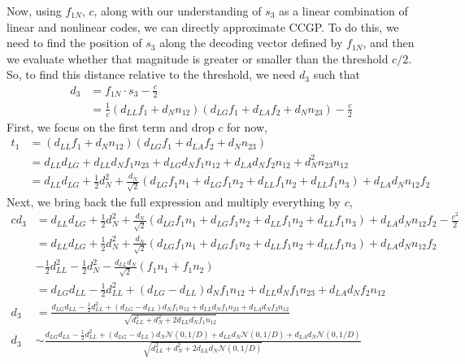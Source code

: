 \documentclass[letter,12pt]{article}
\newcommand{\dll}{d_{LL}}
\newcommand{\dlg}{d_{LG}}
\newcommand{\dla}{d_{LA}}
\newcommand{\dn}{d_{N}}
\newcommand{\dis}{\mathcal{N}(0, 1/D)}
\begin{document}
Now, using $f_{1N}$, $c$, along with our understanding of $s_{3}$
as a linear combination of linear and nonlinear codes, we can directly
approximate CCGP. To do this, we need to find the position
of $s_{3}$ along the decoding vector defined by $f_{1N}$, and then
we evaluate whether that magnitude is greater or smaller than the threshold
$c/2$. So, to find this distance relative to the threshold, we need $d_{3}$ such
that
\begin{align}
  d_{3} &= f_{1N} \cdot s_{3} - \frac{c}{2} \\
  &= \frac{1}{c}\left(\dll f_{1} + \dn n_{12}\right)
  \left(\dlg f_{1} + \dla f_{2} + \dn n_{23}\right) - \frac{c}{2} 
\end{align}
First, we focus on the first term and drop $c$ for now,
\begin{align}
  t_{1} &= \left(\dll f_{1} + \dn n_{12}\right)
  \left(\dlg f_{1} + \dla f_{2} + \dn n_{23}\right) \\
  &= \dll\dlg + \dll \dn f_{1} n_{23} + \dlg \dn f_{1} n_{12}
  + \dla \dn f_{2} n_{12} + \dn^{2} n_{23} n_{12} \\
  &= \dll\dlg + \frac{1}{2}\dn^{2}
  + \frac{\dn}{\sqrt{2}}\left(\dlg f_{1}n_{1} + \dlg f_{1}n_{2}
  + \dll f_{1}n_{2} + \dll f_{1}n_{3}\right) + \dla \dn n_{12}f_{2} 
\end{align}
Next, we bring back the full expression and multiply everything by $c$,
\begin{align}
  c d_{3} &= \dll\dlg + \frac{1}{2}\dn^{2}
  + \frac{\dn}{\sqrt{2}}\left(\dlg f_{1}n_{1} + \dlg f_{1}n_{2}
  + \dll f_{1}n_{2} + \dll f_{1}n_{3}\right) + \dla \dn n_{12}f_{2}
  - \frac{c^{2}}{2} \\
  &= \dll\dlg + \frac{1}{2}\dn^{2}
  + \frac{\dn}{\sqrt{2}}\left(\dlg f_{1}n_{1} + \dlg f_{1}n_{2}
  + \dll f_{1}n_{2} + \dll f_{1}n_{3}\right) + \dla \dn n_{12}f_{2}
  \\ &- \frac{1}{2}\dll^{2} - \frac{1}{2} \dn^{2}
  - \frac{\dll\dn}{\sqrt{2}}\left(f_{1}n_{1} + f_{1}n_{2}\right) \\
  &= \dlg\dll - \frac{1}{2}\dll^{2} + (\dlg - \dll)\dn f_{1}n_{12} +
  \dll\dn f_{1}n_{23} + \dla\dn f_{2}n_{12} \\
  d_{3} &= \frac{\dlg\dll - \frac{1}{2}\dll^{2} + (\dlg - \dll)\dn f_{1}n_{12} +
  \dll\dn f_{1}n_{23} + \dla\dn f_{2}n_{12}}
  {\sqrt{\dll^{2} + \dn^{2} + 2 \dll \dn f_{1}n_{12}}} \\
  d_{3} &\sim \frac{\dlg\dll - \frac{1}{2}\dll^{2} + (\dlg - \dll)\dn \dis +
  \dll\dn \dis + \dla\dn \dis}
  {\sqrt{\dll^{2} + \dn^{2} + 2 \dll \dn \dis}}
\end{align}
\end{document}
